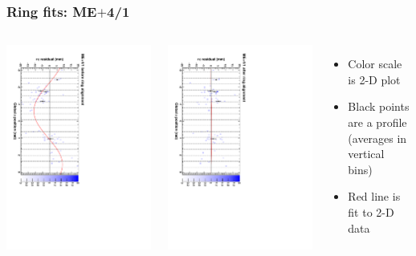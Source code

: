 \documentclass[compress]{beamer}
\begin{document}
\begin{frame}
\frametitle{Ring fits: ME$+$4/1}
\vfill
\begin{columns}
\includegraphics[height=\linewidth, angle=90]{ringfits_before/mep41.pdf}

\includegraphics[height=\linewidth, angle=90]{ringfits_after/mep41.pdf}
\begin{itemize}
\item Color scale is 2-D plot
\item Black points are a profile (averages in vertical bins)
\item Red line is fit to 2-D data
\end{itemize}
\end{columns}
\end{frame}
\end{document}
